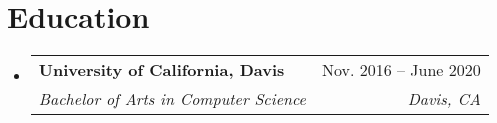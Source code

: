 \documentclass[letterpaper,11pt]{article}
\makeatletter
\newcommand{\resumeSubheading}[4]{
  \vspace{-2pt}\item
    \begin{tabular*}{0.97\textwidth}[t]{l@{\extracolsep{\fill}}r}
      \textbf{#1} & #2 \\
      \textit{\small#3} & \textit{\small #4} \\
    \end{tabular*}\vspace{-7pt}
}
\newcommand{\resumeSubHeadingListStart}{\begin{itemize}[leftmargin=0.15in, label={}]}
\newcommand{\resumeSubHeadingListEnd}{\end{itemize}}
\makeatother
\begin{document}
\section{Education}
  \resumeSubHeadingListStart
    \resumeSubheading
      {University of California, Davis}{Nov. 2016 -- June 2020}
      {Bachelor of Arts in Computer Science}{Davis, CA}
  \resumeSubHeadingListEnd



\end{document}

